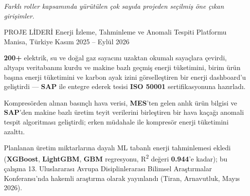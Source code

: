 
{\scriptsize\itshape\color{graytext}Farklı roller kapsamında yürütülen çok sayıda projeden seçilmiş öne çıkan girişimler.\par}
\vspace{-1mm}

\begin{cventries}

  \cventry
    {PROJE LİDERİ} %
    {Enerji İzleme, Tahminleme ve Anomali Tespiti Platformu} %
    {Manisa, Türkiye} %
    {Kasım 2025 -- Eylül 2026} %
    {
      \begin{cvitems} %
        \item {\textbf{200+} elektrik, su ve doğal gaz sayacını uzaktan okumalı sayaçlara çevirdi, altyapı veritabanını kurdu ve makine bazlı geçmiş enerji tüketimini, birim ürün başına enerji tüketimini ve karbon ayak izini görselleştiren bir enerji dashboard'u geliştirdi --- \textbf{SAP} ile entegre ederek tesisi \textbf{ISO 50001} sertifikasyonuna hazırladı.}
        \item {Kompresörden alınan basınçlı hava verisi, \textbf{MES}'ten gelen anlık ürün bilgisi ve \textbf{SAP}'den makine bazlı üretim teyit verilerini birleştiren bir hava kaçağı anomali tespit algoritması geliştirdi; erken müdahale ile kompresör enerji tüketimini azalttı.}
        \item {Planlanan üretim miktarlarına dayalı ML tabanlı enerji tahminlemesi ekledi (\textbf{XGBoost}, \textbf{LightGBM}, \textbf{GBM} regresyonu, R\textsuperscript{2} değeri \textbf{0.944}'e kadar); bu çalışma 13. Uluslararası Avrupa Disiplinlerarası Bilimsel Araştırmalar Konferansı'nda hakemli araştırma olarak yayınlandı (Tiran, Arnavutluk, Mayıs 2026).}
      \end{cvitems}
    }


\end{cventries}
